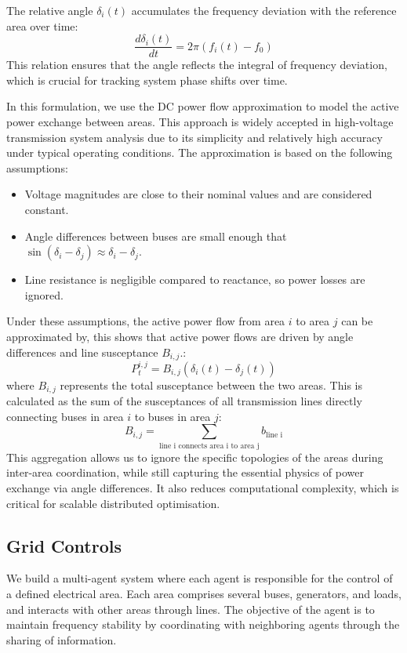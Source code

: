 \documentclass{article}
\begin{document}
The relative angle $\delta_i(t)$ accumulates the frequency deviation with the reference area over time:
\begin{equation}
    \frac{d\delta_i(t)}{dt} = 2\pi(f_i(t) - f_0)
\end{equation}
This relation ensures that the angle reflects the integral of frequency deviation, which is crucial for tracking system phase shifts over time. 


In this formulation, we use the DC power flow approximation to model the active power exchange between areas. This approach is widely accepted in high-voltage transmission system analysis due to its simplicity and relatively high accuracy under typical operating conditions. The approximation is based on the following assumptions:
\begin{itemize}
    \item Voltage magnitudes are close to their nominal values and are considered constant.
    \item Angle differences between buses are small enough that $\sin(\delta_i - \delta_j) \approx \delta_i - \delta_j$.
    \item Line resistance is negligible compared to reactance, so power losses are ignored.
\end{itemize}
Under these assumptions, the active power flow from area $i$ to area $j$ can be approximated by, this shows that active power flows are driven by angle differences and line susceptance $B_{i,j}$.:
\begin{equation}
    P^{i,j}_t = B_{i,j}(\delta_i(t) - \delta_j(t))
\end{equation}
where $B_{i,j}$ represents the total susceptance between the two areas. This is calculated as the sum of the susceptances of all transmission lines directly connecting buses in area $i$ to buses in area $j$:
\begin{equation}
    B_{i,j} = \sum_{\text{line i connects area i to area j}} b_{\text{line i}}
\end{equation}
This aggregation allows us to ignore the specific topologies of the areas during inter-area coordination, while still capturing the essential physics of power exchange via angle differences. It also reduces computational complexity, which is critical for scalable distributed optimisation.

\subsection{Grid Controls}
We build a multi-agent system where each agent is responsible for the control of a defined electrical area. Each area comprises several buses, generators, and loads, and interacts with other areas through lines. The objective of the agent is to maintain frequency stability by coordinating with neighboring agents through the sharing of information. 
\end{document}
